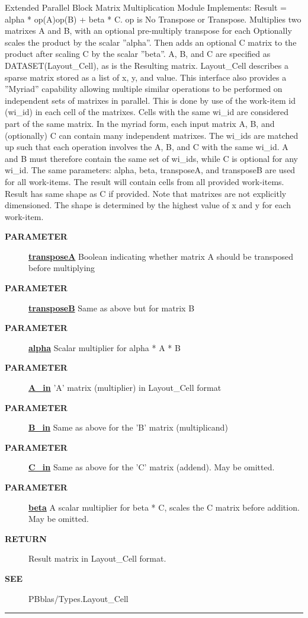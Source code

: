 \par
Extended Parallel Block Matrix Multiplication Module Implements: Result = alpha * op(A)op(B) + beta * C. op is No Transpose or Transpose. Multiplies two matrixes A and B, with an optional pre-multiply transpose for each Optionally scales the product by the scalar ''alpha''. Then adds an optional C matrix to the product after scaling C by the scalar ''beta''. A, B, and C are specified as DATASET(Layout\_Cell), as is the Resulting matrix. Layout\_Cell describes a sparse matrix stored as a list of x, y, and value. This interface also provides a ''Myriad'' capability allowing multiple similar operations to be performed on independent sets of matrixes in parallel. This is done by use of the work-item id (wi\_id) in each cell of the matrixes. Cells with the same wi\_id are considered part of the same matrix. In the myriad form, each input matrix A, B, and (optionally) C can contain many independent matrixes. The wi\_ids are matched up such that each operation involves the A, B, and C with the same wi\_id. A and B must therefore contain the same set of wi\_ids, while C is optional for any wi\_id. The same parameters: alpha, beta, transposeA, and transposeB are used for all work-items. The result will contain cells from all provided work-items. Result has same shape as C if provided. Note that matrixes are not explicitly dimensioned. The shape is determined by the highest value of x and y for each work-item.

\par
\begin{description}
\item [\colorbox{tagtype}{\color{white} \textbf{\textsf{PARAMETER}}}] \textbf{\underline{transposeA}} Boolean indicating whether matrix A should be transposed before multiplying
\item [\colorbox{tagtype}{\color{white} \textbf{\textsf{PARAMETER}}}] \textbf{\underline{transposeB}} Same as above but for matrix B
\item [\colorbox{tagtype}{\color{white} \textbf{\textsf{PARAMETER}}}] \textbf{\underline{alpha}} Scalar multiplier for alpha * A * B
\item [\colorbox{tagtype}{\color{white} \textbf{\textsf{PARAMETER}}}] \textbf{\underline{A\_in}} 'A' matrix (multiplier) in Layout\_Cell format
\item [\colorbox{tagtype}{\color{white} \textbf{\textsf{PARAMETER}}}] \textbf{\underline{B\_in}} Same as above for the 'B' matrix (multiplicand)
\item [\colorbox{tagtype}{\color{white} \textbf{\textsf{PARAMETER}}}] \textbf{\underline{C\_in}} Same as above for the 'C' matrix (addend). May be omitted.
\item [\colorbox{tagtype}{\color{white} \textbf{\textsf{PARAMETER}}}] \textbf{\underline{beta}} A scalar multiplier for beta * C, scales the C matrix before addition. May be omitted.
\item [\colorbox{tagtype}{\color{white} \textbf{\textsf{RETURN}}}] \textbf{\underline{}} Result matrix in Layout\_Cell format.
\item [\colorbox{tagtype}{\color{white} \textbf{\textsf{SEE}}}] \textbf{\underline{}} PBblas/Types.Layout\_Cell
\end{description}

\rule{\linewidth}{0.5pt}
